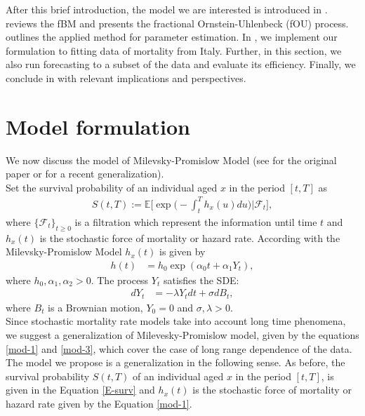 \documentclass[smallextended]{svjour3}
\newcommand{\E}{\mathbb{E}}
\begin{document}


        After this brief introduction, the model we are interested is introduced in .  reviews the fBM and presents
    the fractional Ornstein-Uhlenbeck (fOU) process.  outlines the
    applied method for parameter estimation. In  , we implement our
    formulation to fitting data of mortality from Italy. Further, in
    this section, we also run forecasting to a subset of the data and evaluate
    its efficiency. Finally, we conclude in  with relevant
    implications and perspectives.

\section{Model formulation}\label{model-form}


We now discuss the model of Milevsky-Promislow Model (see \cite{mi-pr} for the original paper
or \cite{gi-or-be}
for a recent generalization). \\

Set the survival probability of an individual aged $x$ in the period $[t,T]$ as
\begin{align}\label{E-surv}
 S(t,T):=\E\Big[\exp\Big(-\int_t^T h_x(u) du\Big)\Big|\mathcal{F}_t \Big],
\end{align}
where $\{\mathcal{F}_t\}_{t\ge 0} $ is a filtration which represent the information until time $t$ and $h_x(t)$ is the
stochastic force of mortality or hazard rate. According with the Milevsky-Promislow Model $h_x(t)$ is given by
\begin{align}
 h(t)&=h_0\exp(\alpha_0t+\alpha_1Y_t),\label{mod-1}
\end{align}
where  $h_0,\alpha_1,\alpha_2> 0$. The process $Y_t$ satisfies the SDE:
\begin{align}
 dY_t&=-\lambda Y_tdt+\sigma dB_t, \label{mod-3}
\end{align}
where $B_t$ is a Brownian motion, $Y_0=0$ and $\sigma,\lambda> 0$.\\


Since stochastic mortality rate models take into account long time phenomena, we
suggest a generalization of Milevesky-Promislow model, given by the equations
\eqref{mod-1} and \eqref{mod-3}, which cover the case of long range dependence of
the data.\\


The model we propose is a generalization in the following sense.
As before, the survival probability $S(t,T)$ of an individual aged
$x$ in the period $[t,T]$, is given in the Equation \eqref{E-surv}
and $h_x(t)$ is the stochastic force of mortality or hazard rate given by the
Equation \eqref{mod-1}.
\end{document}
